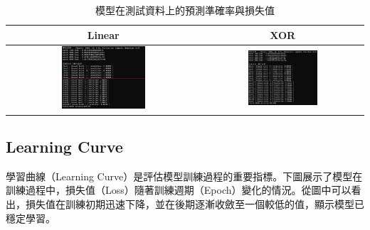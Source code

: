 \documentclass{article}
\begin{document}
\begin{table}[h!]
    \centering
    \caption{模型在測試資料上的預測準確率與損失值}
    \label{fig:accuracy}
    \begin{tabular}{|c|c|}
        \hline
        \textbf{Linear} & \textbf{XOR} \\
        \hline
        \includegraphics[width=0.45\textwidth]{Lab01_report/img/3.2-linear.png} & 
        \includegraphics[width=0.45\textwidth]{Lab01_report/img/3.2-xor.png} \\
        \hline
    \end{tabular}
\end{table}

\subsection{Learning Curve}
學習曲線（Learning Curve）是評估模型訓練過程的重要指標。下圖展示了模型在訓練過程中，損失值（Loss）隨著訓練週期（Epoch）變化的情況。從圖中可以看出，損失值在訓練初期迅速下降，並在後期逐漸收斂至一個較低的值，顯示模型已穩定學習。
\end{document}
